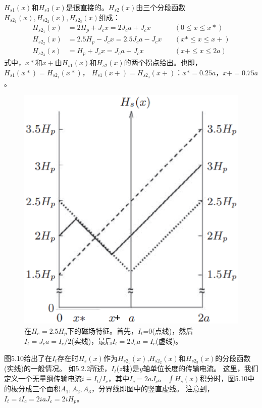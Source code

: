 $H_{s1}(x)$和$H_{s3}(x)$是很直接的。$H_{s2}(x)$由三个分段函数$H_{s2_1}(x),H_{s2_2}(x),H_{s2_3}(x)$组成：
\begin{align*}%
H_{s2_{1}}(x)&=2H_{p}+J_{c}x=2J_{c}a+J_{c}x\qquad&(0\leq x\leq x*)\\
H_{s2_{2}}(x)&=2.5H_{p}-J_{c}x=2.5J_{c}a-J_{c}x\quad&(x*\leq x\leq x+)\\
H_{s2_{3}}(s)&=H_{p}+J_{c}x=J_{c}a+J_{c}x\qquad&(x+\leq x\leq 2a)
\end{align*}
式中，$x*$和$x+$由$H_{s1}(x)$和$H_{s2}(x)$的两个拐点给出。也即，$H_{s1}(x*)=H_{s2_1}(x*)$，
$H_{s1}(x+)=H_{s2_3}(x+)$：$x*=0.25a$，$x+=0.75a$。
\begin{figure}[htbp]
	\centering
	\includegraphics[scale=0.5]{chpt5/figs/fig5.9.eps}
	\caption{在$H_e=2.5H_p$下的磁场特征。首先，$I_t$=0(点线)，然后$I_t=J_c a=I_c/2$(实线)，最后$I_t=2J_c a=I_c$(虚线)。}
\end{figure}

图5.10给出了在$I_t$存在时$H_s(x)$作为$H_{s2_1}(x)$,$H_{s2_2}(x)$和$H_{s2_3}(x)$的分段函数(实线)的一般情况。
如5.2.2所述，$I_t$($z$轴)是$y$轴单位长度的传输电流。
这里，我们定义一个无量纲传输电流$i\equiv I_t/I_c$，其中$I_c=2aJ_c$。
$\int H_s(x)$积分时，图5.10中的板分成三个面积$A_1,A_2,A_3$，分界线即图中的竖直虚线。
注意到，$I_t=i I_c=2iaJ_c=2iH_p$。

